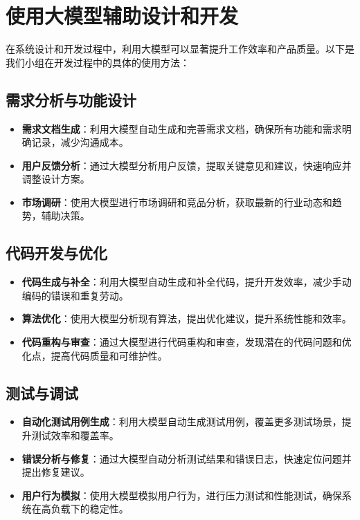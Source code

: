 \documentclass{ctexart}
\begin{document}
\section{使用大模型辅助设计和开发}

在系统设计和开发过程中，利用大模型可以显著提升工作效率和产品质量。以下是我们小组在开发过程中的具体的使用方法：

\subsection{需求分析与功能设计}

\begin{itemize}
    \item \textbf{需求文档生成}：利用大模型自动生成和完善需求文档，确保所有功能和需求明确记录，减少沟通成本。
    \item \textbf{用户反馈分析}：通过大模型分析用户反馈，提取关键意见和建议，快速响应并调整设计方案。
    \item \textbf{市场调研}：使用大模型进行市场调研和竞品分析，获取最新的行业动态和趋势，辅助决策。
\end{itemize}

\subsection{代码开发与优化}

\begin{itemize}
    \item \textbf{代码生成与补全}：利用大模型自动生成和补全代码，提升开发效率，减少手动编码的错误和重复劳动。
    \item \textbf{算法优化}：使用大模型分析现有算法，提出优化建议，提升系统性能和效率。
    \item \textbf{代码重构与审查}：通过大模型进行代码重构和审查，发现潜在的代码问题和优化点，提高代码质量和可维护性。
\end{itemize}

\subsection{测试与调试}

\begin{itemize}
    \item \textbf{自动化测试用例生成}：利用大模型自动生成测试用例，覆盖更多测试场景，提升测试效率和覆盖率。
    \item \textbf{错误分析与修复}：通过大模型自动分析测试结果和错误日志，快速定位问题并提出修复建议。
    \item \textbf{用户行为模拟}：使用大模型模拟用户行为，进行压力测试和性能测试，确保系统在高负载下的稳定性。
\end{itemize}
\end{document}
